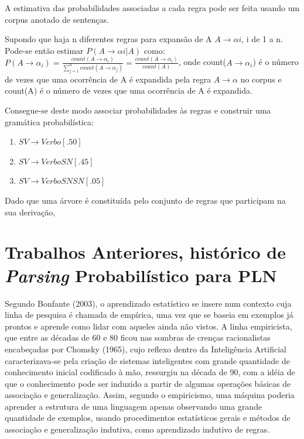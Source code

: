 A estimativa das probabilidades associadas a cada regra pode ser feita usando um corpus anotado de sentenças.



Supondo que haja n diferentes regras para expansão de A $A \rightarrow \alpha i $, i de 1 a n.
\\
Pode-se então estimar $P(A \rightarrow \alpha i|A)$ como:
\\

$ P(A \rightarrow \alpha_i) = \frac{count(A \rightarrow \alpha_i)}{\sum_{j=1}^n count(A \rightarrow \alpha_j)} = \frac{count(A \rightarrow \alpha_i)}{count(A)} $, onde count($A \rightarrow \alpha_i$) é o número de vezes que uma ocorrência de A é expandida pela regra $A \rightarrow \alpha$ no corpus e count(A) é o número de vezes que uma ocorrência de A é expandida.


Consegue-se deste modo associar probabilidades às regras e construir uma gramática probabilística:

\begin{enumerate}
  \item  $SV \rightarrow Verbo [.50]$
  \item  $SV \rightarrow Verbo SN [.45]$
  \item  $SV \rightarrow Verbo SN SN [.05]$
\end{enumerate}


Dado que uma árvore é constituída pelo conjunto de regras que participam na sua derivação, 


\section{Trabalhos Anteriores, histórico de \emph{Parsing} Probabilístico para PLN }
\label{sec:trab_anter}

Segundo Bonfante (2003), o aprendizado estatístico se insere num contexto cuja linha de pesquisa é chamada de empírica, uma vez que se baseia em exemplos já prontos e aprende como lidar com aqueles ainda não vistos. A linha empiricista, que entre as décadas de 60 e 80 ficou nas sombras de crenças racionalistas encabeçadas por Chomsky (1965), cujo reflexo dentro da Inteligência Artificial caracterizava-se pela criação de sistemas inteligentes com grande quantidade de conhecimento inicial codificado à mão, ressurgiu na década de 90, com a idéia de que o conhecimento pode ser induzido a partir de algumas operações básicas de associação e generalização. Assim, segundo o empiricismo, uma máquina poderia aprender a estrutura de uma linguagem apenas observando uma grande quantidade de exemplos, usando procedimentos estatísticos gerais e métodos de associação e generalização indutiva, como aprendizado indutivo de regras.


